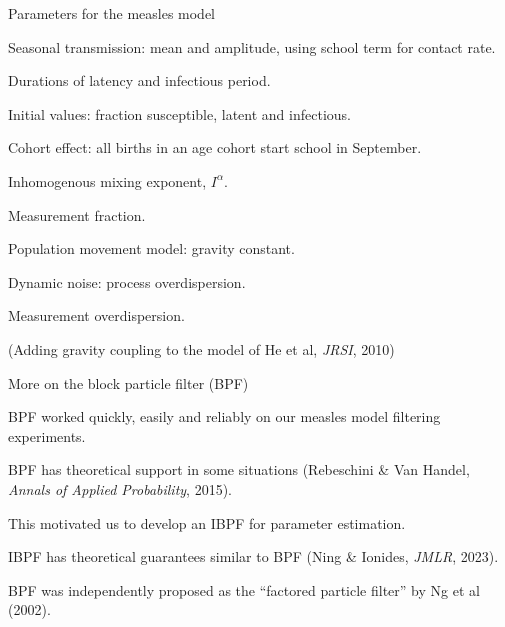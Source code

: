 \documentclass{beamer}
\begin{document}
\begin{frame}{Parameters for the measles model}
  \bi
\item Seasonal transmission: mean and amplitude, using school term for contact rate.
  \item Durations of latency and infectious period.
\item Initial values: fraction susceptible, latent and infectious.
\item Cohort effect: all births in an age cohort start school in September.
\item Inhomogenous mixing exponent, $I^{\alpha}$.
\item Measurement fraction.
\item Population movement model: gravity constant.
\item Dynamic noise: process overdispersion.
\item Measurement overdispersion.

\ei
\vspace{3mm}
(Adding gravity coupling to the model of He et al, {\it JRSI}, 2010)

  \end{frame}

\begin{frame}{More on the block particle filter (BPF)}

\bi
\item BPF worked quickly, easily and reliably on our measles model filtering experiments.

        \vspace{2mm}


\item BPF has theoretical support in some situations (Rebeschini \& Van Handel, {\it Annals of Applied Probability}, 2015).

        \vspace{2mm}

      \item This motivated us to develop an IBPF for parameter estimation.
        
        \vspace{2mm}

      \item IBPF has theoretical guarantees similar to BPF (Ning \& Ionides, {\it JMLR}, 2023).
        
        \vspace{2mm}

        
\item BPF was independently proposed as the ``factored particle filter'' by Ng et al (2002).

\ei

\end{frame}
\end{document}

